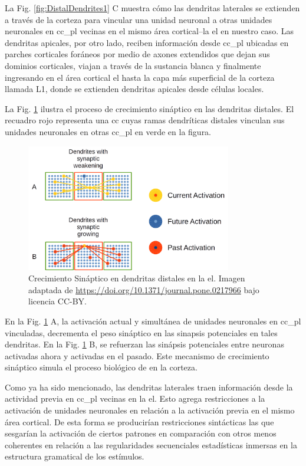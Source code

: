 {La Fig. \ref{fig:DistalDendrites1} C muestra cómo las dendritas laterales se extienden a través de la corteza para vincular una unidad neuronal a otras unidades neuronales en \gls{cc_pl} vecinas en el mismo área cortical--la \gls{el} en nuestro caso.
Las dendritas apicales, por otro lado, reciben información desde \gls{cc_pl} ubicadas en parches corticales foráneos por medio de axones extendidos que dejan sus dominios corticales, viajan a través de la sustancia blanca y finalmente ingresando en el área cortical \gls{el} hasta la capa más superficial de la corteza llamada L1, donde se extienden dendritas apicales desde células locales. 


La Fig. \ref{fig:DistalDendritesGrowth} ilustra el proceso de crecimiento sináptico en las dendritas distales. 
El recuadro rojo representa una \gls{cc} cuyas ramas dendríticas distales vinculan sus unidades neuronales en otras \gls{cc_pl} en verde en la figura.

\begin{figure}[ht!]
    \centering
    \includegraphics[width=0.8\textwidth]{DistalDendritesGrowth.png}
    \caption{Crecimiento Sináptico en dendritas distales en la \gls{el}.
    Imagen adaptada de \url{https://doi.org/10.1371/journal.pone.0217966} bajo licencia CC-BY.}
    \label{fig:DistalDendritesGrowth}
\end{figure}

En la Fig. \ref{fig:DistalDendritesGrowth} A, la activación actual y simultánea de unidades neuronales en \gls{cc_pl} vinculadas, decrementa el peso sináptico en las sinapsis potenciales en tales dendritas.
En la Fig. \ref{fig:DistalDendritesGrowth} B, se refuerzan las sinápsis potenciales entre neuronas activadas ahora y activadas en el pasado.
Este mecanismo de crecimiento sináptico simula el proceso biológico de  en la corteza.
 
Como ya ha sido mencionado, las dendritas laterales traen información desde la actividad previa en \gls{cc_pl} vecinas en la \gls{el}.
Esto agrega restricciones a la activación de unidades neuronales en relación a la activación previa en el mismo área cortical.
De esta forma se producirían restricciones sintácticas las que sesgarían la activación de ciertos patrones en comparación con otros menos coherentes en relación a las regularidades secuenciales estadísticas inmersas en la estructura gramatical de los estímulos.

}

